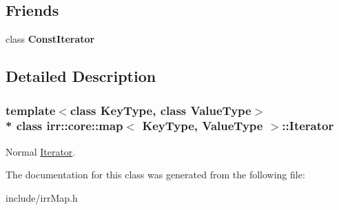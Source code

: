 \subsection*{Friends}
\begin{DoxyCompactItemize}
\item 
class {\bfseries Const\+Iterator}\hypertarget{classirr_1_1core_1_1map_1_1Iterator_a5485970bb9da6b5d782fa28638b5658f}{}\label{classirr_1_1core_1_1map_1_1Iterator_a5485970bb9da6b5d782fa28638b5658f}

\end{DoxyCompactItemize}


\subsection{Detailed Description}
\subsubsection*{template$<$class Key\+Type, class Value\+Type$>$\\*
class irr\+::core\+::map$<$ Key\+Type, Value\+Type $>$\+::\+Iterator}

Normal \hyperlink{classirr_1_1core_1_1map_1_1Iterator}{Iterator}. 

The documentation for this class was generated from the following file\+:\begin{DoxyCompactItemize}
\item 
include/irr\+Map.\+h\end{DoxyCompactItemize}
